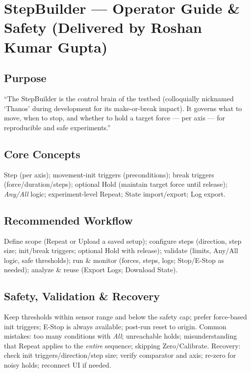 \documentclass[
    twocolumn,
    fontsize = 10pt,
    parskip = half+,
    headings = small,
    headwidth = text,
    footwidth = text,
]{scrartcl}
\begin{document}

\section{StepBuilder — Operator Guide \& Safety \textnormal{(Delivered by Roshan Kumar Gupta)}}
\label{sec:stepbuilder}

\subsection{Purpose}
``The StepBuilder is the control brain of the testbed (colloquially nicknamed `Thanos' during development for its make-or-break impact). It governs what to move, when to stop, and whether to hold a target force — per axis — for reproducible and safe experiments.''

\subsection{Core Concepts}
Step (per axis); movement-init triggers (preconditions); break triggers (force/duration/steps); optional Hold (maintain target force until release); \emph{Any/All} logic; experiment-level Repeat; State import/export; Log export.

\subsection{Recommended Workflow}
Define scope (Repeat or Upload a saved setup); configure steps (direction, step size; init/break triggers; optional Hold with release); validate (limits, Any/All logic, safe thresholds); run \& monitor (forces, steps, logs; Stop/E-Stop as needed); analyze \& reuse (Export Logs; Download State).

\subsection{Safety, Validation \& Recovery}
Keep thresholds within sensor range and below the safety cap; prefer force-based init triggers; E-Stop is always available; post-run reset to origin. Common mistakes: too many conditions with \emph{All}; unreachable holds; misunderstanding that Repeat applies to the \emph{entire} sequence; skipping Zero/Calibrate. Recovery: check init triggers/direction/step size; verify comparator and axis; re-zero for noisy holds; reconnect UI if needed.
\end{document}
